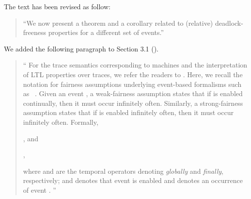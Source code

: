 \documentclass{response}
\begin{document}
\begin{comment}{Reviewer \#1}
• p. 20 typo. We are now present
\end{comment}

\begin{response}
  The text has been revised as follow:
  \begin{quote}
    ``We now present a theorem and a corollary related to (relative)
    deadlock-freeness properties for a different set of events.''
  \end{quote}
\end{response}

\begin{comment}{Reviewer \#1}
• p. 21 Could you give a formal definition or at least a reference of your 
strong fairness.
\end{comment}

\begin{response}
  We added the following paragraph to Section 3.1 (\EventB).
  \begin{quote}
    ``  For the trace semantics corresponding to \mbox{\EventB} machines and
  the interpretation of LTL properties over traces, we refer the readers
  to \mbox{\cite{hoang2016ltl}}.  Here, we recall the notation for
  fairness assumptions underlying event-based formalisms such as
  \mbox{\EventB~\cite{lamport1977proving,hudon16:_unit_b_method}}. Given
  an event \mbox{}, a weak-fairness assumption
  \mbox{} states that if \mbox{}
  is enabled continually, then it must occur infinitely often.
  Similarly, a strong-fairness assumption \mbox{}
  states that if \mbox{} is enabled infinitely often,
  then it must occur infinitely often. Formally,
\begin{center}
  , and

  ,
\end{center}
  where \mbox{} and \mbox{} are the
  temporal operators denoting \emph{globally} and \emph{finally},
  respectively; and \mbox{} denotes that
  event \mbox{} is enabled and
  \mbox{\EventBInline{[e]}} denotes an occurrence of event
  \mbox{}.
   ''
  \end{quote}
\end{response}

\begin{comment}{Reviewer \#1}
• p.22 Could you comment on your definition of anticipated events. Why the set 
of convergent events is necessary to recall just before?
\end{comment}
\end{document}
